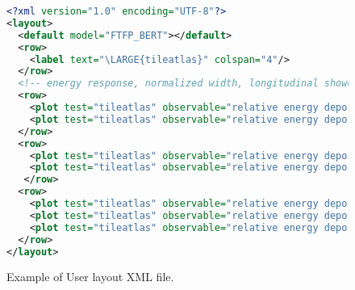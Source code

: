 \begin{figure}[h]

\begin{lstlisting}[language=xml,firstnumber=1,breaklines=true,
  postbreak=\mbox{\textcolor{red}{$\hookrightarrow$}\space}]
<?xml version="1.0" encoding="UTF-8"?>
<layout>
  <default model="FTFP_BERT"></default>
  <row>
    <label text="\LARGE{tileatlas}" colspan="4"/>
  </row>
  <!-- energy response, normalized width, longitudinal shower shape and lateral shower shape -->
  <row>
    <plot test="tileatlas" observable="relative energy deposition" beam="e-" energy="10"   secondary="None" target="tileatlas" parname="THETA" parvalue="0 degrees" yaxis="lin" xaxis="lin" title=""/>
    <plot test="tileatlas" observable="relative energy deposition" beam="e-" energy="10"   secondary="None" target="tileatlas" parname="THETA" parvalue="20 degrees" yaxis="lin" xaxis="lin" title=""/>
  </row>
  <row>
    <plot test="tileatlas" observable="relative energy deposition" beam="e-" energy="20"   secondary="None" target="tileatlas" parname="THETA" parvalue="21 degrees" yaxis="lin" xaxis="lin" title=""/>
    <plot test="tileatlas" observable="relative energy deposition" beam="e-" energy="20"   secondary="None" target="tileatlas" parname="THETA" parvalue="61 degrees" yaxis="lin" xaxis="lin" title=""/>
   </row>
  <row>
    <plot test="tileatlas" observable="relative energy deposition" beam="e-" energy="100"   secondary="None" target="tileatlas" parname="THETA" parvalue="0 degrees" yaxis="lin" xaxis="lin" title=""/>
    <plot test="tileatlas" observable="relative energy deposition" beam="e-" energy="100"   secondary="None" target="tileatlas" parname="THETA" parvalue="10 degrees" yaxis="lin" xaxis="lin" title=""/>
    <plot test="tileatlas" observable="relative energy deposition" beam="e-" energy="100"   secondary="None" target="tileatlas" parname="THETA" parvalue="20 degrees" yaxis="lin" xaxis="lin" title=""/>
  </row>
</layout>
\end{lstlisting}

\caption{Example of User layout XML file.}
\label{adx:XML-format}
\end{figure}



